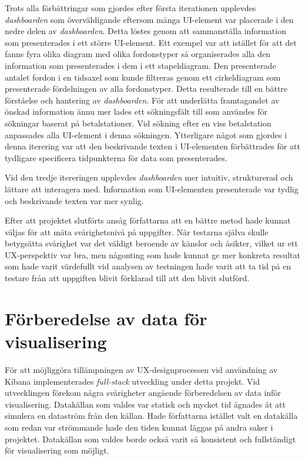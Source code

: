 \documentclass[12pt]{kththesis}
\begin{document}
Trots alla förbättringar som gjordes efter första iterationen upplevdes \textit{dashboarden} som överväldigande eftersom många UI-element var placerade i den nedre delen av \textit{dashboarden}. Detta löstes genom att sammanställa information som presenterades i ett större UI-element. Ett exempel var att istället för att det fanns fyra olika diagram med olika fordonstyper så organiserades alla den information som presenterades i dem i ett stapeldiagram. Den presenterade antalet fordon i en tidsaxel som kunde filtreras genom ett cirkeldiagram som presenterade fördelningen av alla fordonstyper. Detta resulterade till en bättre förståelse och hantering av \textit{dashboarden}. För att underlätta framtagandet av önskad information ännu mer lades ett sökningsfält till som användes för sökningar baserat på betalstationer. Vid sökning efter en viss betalstation anpassades alla UI-element i denna sökningen. Ytterligare något som gjordes i denna iterering var att den beskrivande texten i UI-elementen förbättrades för att tydligare specificera tidpunkterna för data som presenterades. 

Vid den tredje itereringen upplevdes \textit{dashboarden} mer intuitiv, strukturerad och lättare att interagera med. Information som UI-elementen presenterade var tydlig och beskrivande texten var mer synlig. 

Efter att projektet slutförts ansåg författarna att en bättre metod hade kunnat väljas för att mäta svårighetsnivå på uppgifter. När testarna själva skulle betygsätta svårighet var det väldigt beroende av känslor och åsikter, vilket ur ett UX-perspektiv var bra, men någonting som hade kunnat ge mer konkreta resultat som hade varit värdefullt vid analysen av testningen hade varit att ta tid på en testare från att uppgiften blivit förklarad till att den blivit slutförd. 

\section{Förberedelse av data för visualisering}
För att möjliggöra tillämpningen av UX-designprocessen vid användning av Kibana implementerades \textit{full-stack} utveckling under detta projekt. Vid utvecklingen förekom några svårigheter angående förberedelsen av data inför visualisering. Datakällan som valdes var statisk och mycket tid ägnades åt att simulera en dataström från den källan. Hade författarna istället valt en datakälla som redan var strömmande hade den tiden kunnat läggas på andra saker i projektet. Datakällan som valdes borde också varit så konsistent och fullständigt för visualisering som möjligt. 
\end{document}
